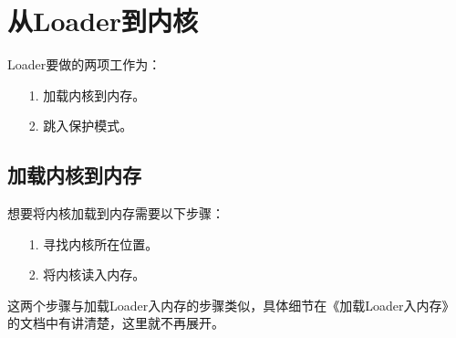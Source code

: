 \documentclass[a4paper,left=2.5cm,right=2.5cm,11pt]{article}
\begin{document}
\tableofcontents

\clearpage

\section{从Loader到内核}
	Loader要做的两项工作为：
	\begin{itemize}
		\item[1.] 加载内核到内存。
		\item[2.] 跳入保护模式。
	\end{itemize}

\subsection{加载内核到内存}
	想要将内核加载到内存需要以下步骤：
	\begin{itemize}
		\item[1.] 寻找内核所在位置。
		\item[2.] 将内核读入内存。
	\end{itemize}

	这两个步骤与加载Loader入内存的步骤类似，具体细节在《加载Loader入内存》的文档中有讲清楚，这里就不再展开。\par
\end{document}
